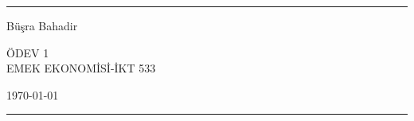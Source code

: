 \documentclass[a4paper]{article}
\begin{document}

\fancyhead[C]{}
\hrule \medskip %
\begin{minipage}{0.295\textwidth} 
\raggedright
\footnotesize
Büşra Bahadir \hfill\\   

\end{minipage}
\begin{minipage}{0.4\textwidth} 
\centering 
\large 
ÖDEV 1\\ 
\normalsize 
EMEK EKONOMİSİ-İKT 533\\ 
\end{minipage}
\begin{minipage}{0.295\textwidth} 
\raggedleft
\today\hfill\\
\end{minipage}
\medskip\hrule 
\bigskip

\end{document}
